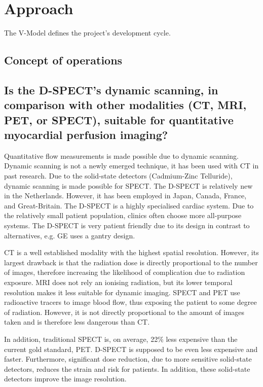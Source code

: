 \section{Approach}
The V-Model defines the project's development cycle. 

\subsection{Concept of operations}
\label{sec:concept_oper}
\subsection*{Is the D-SPECT's dynamic scanning, in comparison with other modalities (CT, MRI, PET, or SPECT), suitable for quantitative myocardial perfusion imaging?}
Quantitative flow measurements is made possible due to dynamic scanning. Dynamic scanning is not a newly emerged technique, it has been used with \ac{CT} in past research. Due to the solid-state detectors (Cadmium-Zinc Telluride), dynamic scanning is made possible for \ac{SPECT}. The D-SPECT is relatively new in the Netherlands. However, it has been employed in Japan, Canada, France, and Great-Britain. The D-SPECT is a highly specialised cardiac system. Due to the relatively small patient population, clinics often choose more all-purpose systems. The D-SPECT is very patient friendly due to its design in contrast to alternatives, e.g. GE uses a gantry design.

\ac{CT} is a well established modality with the highest spatial resolution. However, its largest drawback is that the radiation dose is directly proportional to the number of images, therefore increasing the likelihood of complication due to radiation exposure. \ac{MRI} does not rely an ionising radiation, but its lower temporal resolution makes it less suitable for dynamic imaging. \ac{SPECT} and \ac{PET} use radioactive tracers to image blood flow, thus exposing the patient to some degree of radiation. However, it is not directly proportional to the amount of images taken and is therefore less dangerous than \ac{CT}.

In addition, traditional \ac{SPECT} is, on average, 22\% less expensive than the current gold standard, \ac{PET}. D-SPECT is supposed to be even less expensive and faster. Furthermore, significant dose reduction, due to more sensitive solid-state detectors, reduces the strain and risk for patients. In addition, these solid-state detectors improve the image resolution. 

